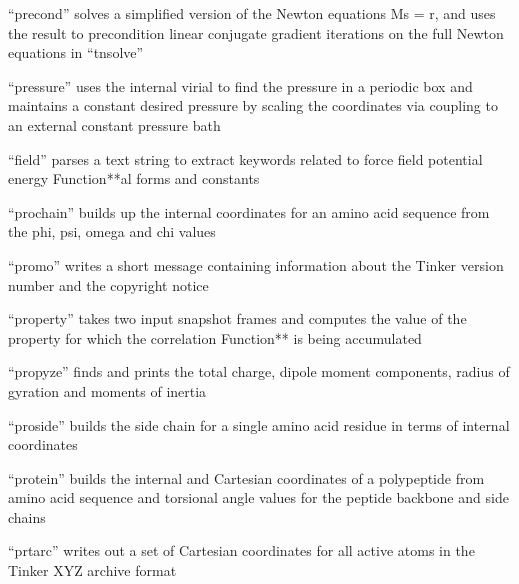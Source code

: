\documentclass[letterpaper,11pt,english]{sphinxmanual}
\begin{document}

“precond” solves a simplified version of the Newton equations Ms = r, and uses the result to precondition linear conjugate gradient iterations on the full Newton equations in “tnsolve”


“pressure” uses the internal virial to find the pressure in a periodic box and maintains a constant desired pressure by scaling the coordinates via coupling to an external constant pressure bath


“field” parses a text string to extract keywords related to force field potential energy Function**al forms and constants


“prochain” builds up the internal coordinates for an amino acid sequence from the phi, psi, omega and chi values



“promo” writes a short message containing information about the Tinker version number and the copyright notice


“property” takes two input snapshot frames and computes the value of the property for which the correlation Function** is being accumulated


“propyze” finds and prints the total charge, dipole moment components, radius of gyration and moments of inertia


“proside” builds the side chain for a single amino acid residue in terms of internal coordinates


“protein” builds the internal and Cartesian coordinates of a polypeptide from amino acid sequence and torsional angle values for the peptide backbone and side chains


“prtarc” writes out a set of Cartesian coordinates for all active atoms in the Tinker XYZ archive format
\end{document}

